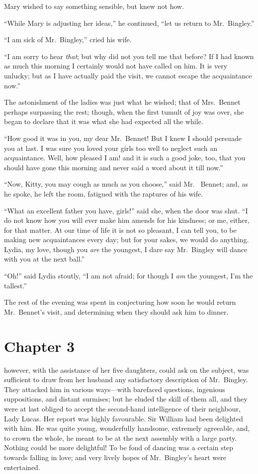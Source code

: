 Mary wished to say something sensible, but knew not how.

``While Mary is adjusting her ideas,'' he continued, ``let us return
to Mr.\ Bingley.''

``I am sick of Mr.\ Bingley,'' cried his wife.

``I am sorry to hear \emph{that}; but why did not you tell me that
before?  If I had known as much this morning I certainly would
not have called on him.  It is very unlucky; but as I have
actually paid the visit, we cannot escape the acquaintance now.''

The astonishment of the ladies was just what he wished; that of
Mrs.\ Bennet perhaps surpassing the rest; though, when the first
tumult of joy was over, she began to declare that it was what she
had expected all the while.

``How good it was in you, my dear Mr.\ Bennet!  But I knew I should
persuade you at last.  I was sure you loved your girls too well
to neglect such an acquaintance.  Well, how pleased I am! and it
is such a good joke, too, that you should have gone this morning
and never said a word about it till now.''

``Now, Kitty, you may cough as much as you choose,'' said Mr.\ %
Bennet; and, as he spoke, he left the room, fatigued with the
raptures of his wife.

``What an excellent father you have, girls!'' said she, when the
door was shut.  ``I do not know how you will ever make him
amends for his kindness; or me, either, for that matter.  At our
time of life it is not so pleasant, I can tell you, to be making
new acquaintances every day; but for your sakes, we would do
anything.  Lydia, my love, though you \emph{are} the youngest, I dare
say Mr.\ Bingley will dance with you at the next ball.''

``Oh!'' said Lydia stoutly, ``I am not afraid; for though I \emph{am} the
youngest, I'm the tallest.''

The rest of the evening was spent in conjecturing how soon he
would return Mr.\ Bennet's visit, and determining when they
should ask him to dinner.



\chapter{Chapter 3}


 however, with the assistance of her
five daughters, could ask on the subject, was sufficient to draw
from her husband any satisfactory description of Mr.\ Bingley.
They attacked him in various ways---with barefaced questions,
ingenious suppositions, and distant surmises; but he eluded the
skill of them all, and they were at last obliged to accept the
second-hand intelligence of their neighbour, Lady Lucas.  Her
report was highly favourable.  Sir William had been delighted
with him.  He was quite young, wonderfully handsome, extremely
agreeable, and, to crown the whole, he meant to be at the next
assembly with a large party.  Nothing could be more delightful!
To be fond of dancing was a certain step towards falling in love;
and very lively hopes of Mr.\ Bingley's heart were entertained.

